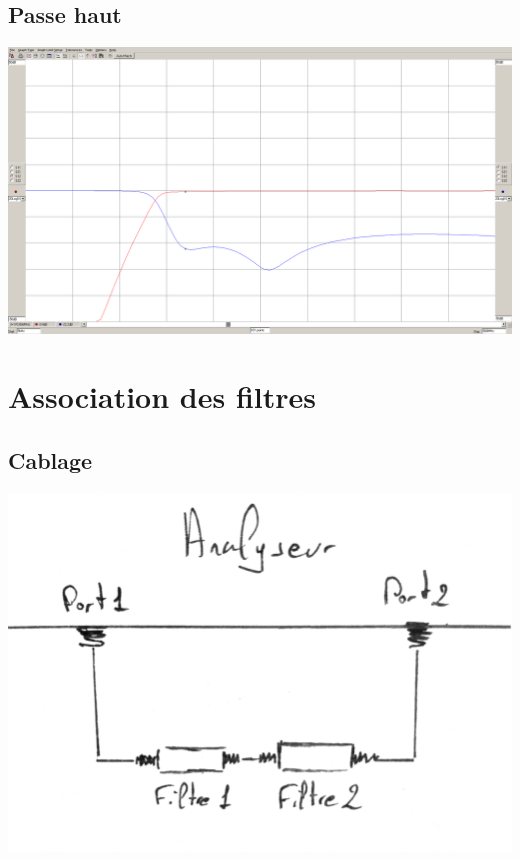 \documentclass[a4paper,12pt]{report}            %
\begin{document}
\section{Passe haut}

\begin{center}\includegraphics[scale = 0.25]{pic/parametre_passe_haut.png}\\ \end{center}

\chapter{Association des filtres}

\section{Cablage}

\begin{center}\includegraphics[scale = 0.2]{pic/Cablage_filtre2.png}\\ \end{center}
\end{document}
